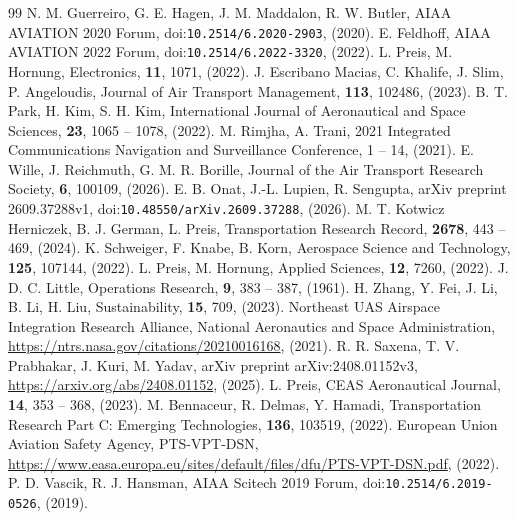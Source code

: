 \begin{thebibliography}{99}
 N. M. Guerreiro, G. E. Hagen, J. M. Maddalon, R. W. Butler, AIAA AVIATION 2020 Forum, doi:\nolinkurl{10.2514/6.2020-2903}, (2020).
 E. Feldhoff, AIAA AVIATION 2022 Forum, doi:\nolinkurl{10.2514/6.2022-3320}, (2022).
 L. Preis, M. Hornung, Electronics, \textbf{11}, 1071, (2022).
 J. Escribano Macias, C. Khalife, J. Slim, P. Angeloudis, Journal of Air Transport Management, \textbf{113}, 102486, (2023).
 B. T. Park, H. Kim, S. H. Kim, International Journal of Aeronautical and Space Sciences, \textbf{23}, 1065 -- 1078, (2022).
 M. Rimjha, A. Trani, 2021 Integrated Communications Navigation and Surveillance Conference, 1 -- 14, (2021).
 E. Wille, J. Reichmuth, G. M. R. Borille, Journal of the Air Transport Research Society, \textbf{6}, 100109, (2026).
 E. B. Onat, J.-L. Lupien, R. Sengupta, arXiv preprint 2609.37288v1, doi:\nolinkurl{10.48550/arXiv.2609.37288}, (2026).
 M. T. Kotwicz Herniczek, B. J. German, L. Preis, Transportation Research Record, \textbf{2678}, 443 -- 469, (2024).
 K. Schweiger, F. Knabe, B. Korn, Aerospace Science and Technology, \textbf{125}, 107144, (2022).
 L. Preis, M. Hornung, Applied Sciences, \textbf{12}, 7260, (2022).
 J. D. C. Little, Operations Research, \textbf{9}, 383 -- 387, (1961).
 H. Zhang, Y. Fei, J. Li, B. Li, H. Liu, Sustainability, \textbf{15}, 709, (2023).
 Northeast UAS Airspace Integration Research Alliance, National Aeronautics and Space Administration, \url{https://ntrs.nasa.gov/citations/20210016168}, (2021).
 R. R. Saxena, T. V. Prabhakar, J. Kuri, M. Yadav, arXiv preprint arXiv:2408.01152v3, \url{https://arxiv.org/abs/2408.01152}, (2025).
 L. Preis, CEAS Aeronautical Journal, \textbf{14}, 353 -- 368, (2023).
 M. Bennaceur, R. Delmas, Y. Hamadi, Transportation Research Part C: Emerging Technologies, \textbf{136}, 103519, (2022).
 European Union Aviation Safety Agency, PTS-VPT-DSN, \url{https://www.easa.europa.eu/sites/default/files/dfu/PTS-VPT-DSN.pdf}, (2022).
 P. D. Vascik, R. J. Hansman, AIAA Scitech 2019 Forum, doi:\nolinkurl{10.2514/6.2019-0526}, (2019).

\end{thebibliography}

